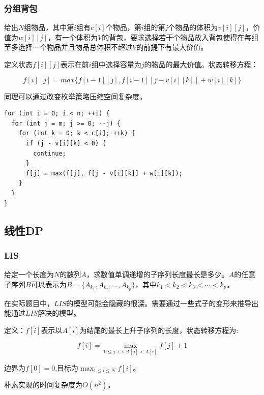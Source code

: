 \documentclass[11pt]{article}
\begin{document}
\subsubsection{分组背包}
\label{sec:org49be9f6}

给出\(N\)组物品，其中第\(i\)组有\(c[i]\)个物品，第\(i\)组的第\(j\)个物品的体积为\(v[i][j]\)，价值为\(w[i][j]\)，有一个体积为\(V\)的背包，要求选择若干个物品放入背包使得在每组至多选择一个物品并且物品总体积不超过\(V\)的前提下有最大价值。

定义状态\(f[i][j]\)表示在前\(i\)组中选择容量为\(j\)的物品的最大价值。状态转移方程：

\[
f[i][j]=max\{f[i-1][j],f[i-1][j-v[i][k]]+w[i][k]\}
\]

同理可以通过改变枚举策略压缩空间复杂度。

\begin{verbatim}
for (int i = 0; i < n; ++i) {
  for (int j = m; j >= 0; --j) {
    for (int k = 0; k < c[i]; ++k) {
      if (j - v[i][k] < 0) {
        continue;
      }
      f[j] = max(f[j], f[j - v[i][k]] + w[i][k]);
    }
  }
}
\end{verbatim}

\subsection{线性DP}
\label{sec:orgfafe350}
\subsubsection{LIS}
\label{sec:orgae4b4dd}

给定一个长度为\(N\)的数列\(A\)，求数值单调递增的子序列长度最长是多少。\(A\)的任意子序列\(B\)可以表示为\(B=\{A_{k_1},A_{k_2},...,A_{k_p}\}\)，其中\(k_1 < k_2 < k_3 < \cdots < k_p\)。

在实际题目中，\(LIS\)的模型可能会隐藏的很深。需要通过一些式子的变形来推导出能通过\(LIS\)解决的模型。

定义：\(f[i]\)表示以\(A[i]\)为结尾的最长上升子序列的长度，状态转移方程为:

\[
f[i]= \max_{0 \leq j < i,A[j] < A[i]} {f[j]+1}
\]

边界为\(f[0]=0\),目标为\(\max_{1 \leq i \leq N} {f[i]}\)。

朴素实现的时间复杂度为\(O(n^2)\)。
\end{document}
